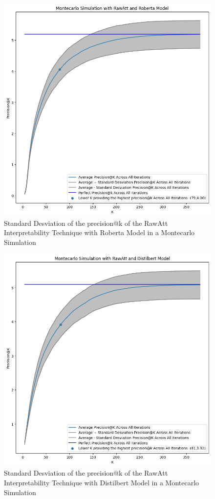 \begin{figure}[H]
    \centering%
    \includegraphics[width=0.75\linewidth]{Figures/Experimental Setup/Fill_Between_Roberta_RawAtt.png}
    \caption{Standard Desviation of the precision@k of the RawAtt Interpretability Technique with Roberta Model in a Montecarlo Simulation}
    \label{msroberta}
\end{figure}

\begin{figure}[H]
    \centering%
    \includegraphics[width=0.75\linewidth]{Figures/Experimental Setup/Fill_Between_Distilbert_RawAtt.png}
    \caption{Standard Desviation of the precision@k of the RawAtt Interpretability Technique with Distilbert Model in a Montecarlo Simulation}
    \label{msdistilbert}
\end{figure}

